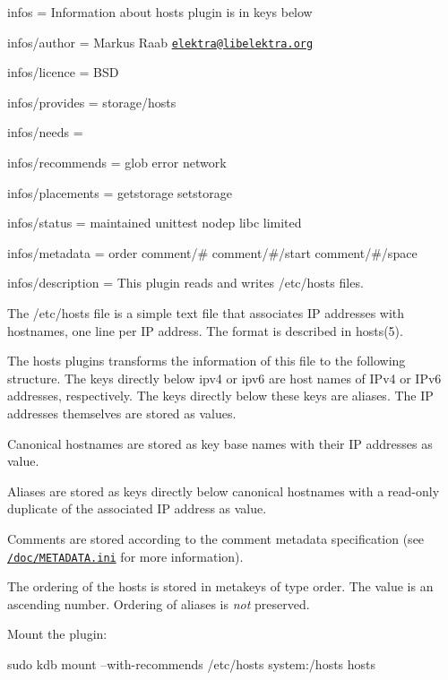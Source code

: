 
\begin{DoxyItemize}
\item infos = Information about hosts plugin is in keys below
\item infos/author = Markus Raab \href{mailto:elektra@libelektra.org}{\tt elektra@libelektra.\+org}
\item infos/licence = B\+SD
\item infos/provides = storage/hosts
\item infos/needs =
\item infos/recommends = glob error network
\item infos/placements = getstorage setstorage
\item infos/status = maintained unittest nodep libc limited
\item infos/metadata = order comment/\# comment/\#/start comment/\#/space
\item infos/description = This plugin reads and writes /etc/hosts files.
\end{DoxyItemize}

The {\ttfamily /etc/hosts} file is a simple text file that associates IP addresses with hostnames, one line per IP address. The format is described in {\ttfamily hosts(5)}.

The {\ttfamily hosts} plugins transforms the information of this file to the following structure. The keys directly below {\ttfamily ipv4} or {\ttfamily ipv6} are host names of I\+Pv4 or I\+Pv6 addresses, respectively. The keys directly below these keys are aliases. The IP addresses themselves are stored as values.

Canonical hostnames are stored as key base names with their IP addresses as value.

Aliases are stored as keys directly below canonical hostnames with a read-\/only duplicate of the associated IP address as value.

Comments are stored according to the comment metadata specification (see \href{/home/jenkins/workspace/libelektra-release/doc/METADATA.ini}{\tt /doc/\+M\+E\+T\+A\+D\+A\+TA.ini} for more information).

The ordering of the hosts is stored in metakeys of type {\ttfamily order}. The value is an ascending number. Ordering of aliases is {\itshape not} preserved.

Mount the plugin\+:


\begin{DoxyCode}
sudo kdb mount --with-recommends /etc/hosts system:/hosts hosts
\end{DoxyCode}


